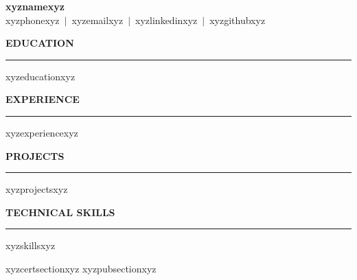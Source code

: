 \documentclass[10pt,letterpaper]{article}
\newcommand{\resumesection}[1]{%
  \vspace{6pt}%
  {\large\textbf{#1}}\\%
  \hrule%
  \vspace{3pt}%
}
\begin{document}
{\large\bfseries xyznamexyz}\\
xyzphonexyz\ $|$\ xyzemailxyz\ $|$\ xyzlinkedinxyz\ $|$\ xyzgithubxyz

\vspace{4pt}

\resumesection{EDUCATION}
xyzeducationxyz

\resumesection{EXPERIENCE}
xyzexperiencexyz

\resumesection{PROJECTS}
xyzprojectsxyz

\resumesection{TECHNICAL SKILLS}
\begin{itemize}[leftmargin=1.5em,itemsep=1pt,topsep=2pt]
xyzskillsxyz
\end{itemize}

xyzcertsectionxyz
xyzpubsectionxyz
\end{document}
